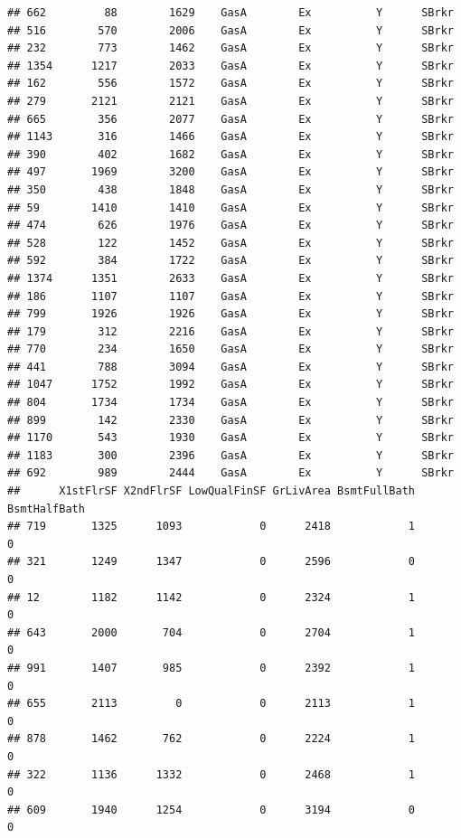 \documentclass[]{article}
\begin{document}
\begin{verbatim}
## 662         88        1629    GasA        Ex          Y      SBrkr
## 516        570        2006    GasA        Ex          Y      SBrkr
## 232        773        1462    GasA        Ex          Y      SBrkr
## 1354      1217        2033    GasA        Ex          Y      SBrkr
## 162        556        1572    GasA        Ex          Y      SBrkr
## 279       2121        2121    GasA        Ex          Y      SBrkr
## 665        356        2077    GasA        Ex          Y      SBrkr
## 1143       316        1466    GasA        Ex          Y      SBrkr
## 390        402        1682    GasA        Ex          Y      SBrkr
## 497       1969        3200    GasA        Ex          Y      SBrkr
## 350        438        1848    GasA        Ex          Y      SBrkr
## 59        1410        1410    GasA        Ex          Y      SBrkr
## 474        626        1976    GasA        Ex          Y      SBrkr
## 528        122        1452    GasA        Ex          Y      SBrkr
## 592        384        1722    GasA        Ex          Y      SBrkr
## 1374      1351        2633    GasA        Ex          Y      SBrkr
## 186       1107        1107    GasA        Ex          Y      SBrkr
## 799       1926        1926    GasA        Ex          Y      SBrkr
## 179        312        2216    GasA        Ex          Y      SBrkr
## 770        234        1650    GasA        Ex          Y      SBrkr
## 441        788        3094    GasA        Ex          Y      SBrkr
## 1047      1752        1992    GasA        Ex          Y      SBrkr
## 804       1734        1734    GasA        Ex          Y      SBrkr
## 899        142        2330    GasA        Ex          Y      SBrkr
## 1170       543        1930    GasA        Ex          Y      SBrkr
## 1183       300        2396    GasA        Ex          Y      SBrkr
## 692        989        2444    GasA        Ex          Y      SBrkr
##      X1stFlrSF X2ndFlrSF LowQualFinSF GrLivArea BsmtFullBath BsmtHalfBath
## 719       1325      1093            0      2418            1            0
## 321       1249      1347            0      2596            0            0
## 12        1182      1142            0      2324            1            0
## 643       2000       704            0      2704            1            0
## 991       1407       985            0      2392            1            0
## 655       2113         0            0      2113            1            0
## 878       1462       762            0      2224            1            0
## 322       1136      1332            0      2468            1            0
## 609       1940      1254            0      3194            0            0

\end{verbatim}
\end{document}
